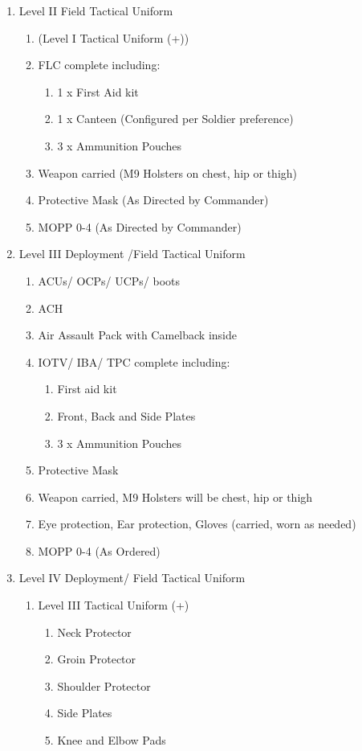 \documentclass{article}
\begin{document}
\begin{enumerate}
\item Level II Field Tactical Uniform
\begin{enumerate}
    \item (Level I Tactical Uniform (+))
     \item	FLC complete including:
     \begin{enumerate}
         \item  1 x First Aid kit
\item 1 x Canteen (Configured per Soldier preference)
\item 3 x Ammunition Pouches
\end{enumerate}
\item	Weapon carried (M9 Holsters on chest, hip or thigh)
\item	Protective Mask (As Directed by Commander)
\item	MOPP 0-4 (As Directed by Commander) 
\end{enumerate}
\item Level III Deployment /Field Tactical Uniform
\begin{enumerate}
    \item 	ACUs/ OCPs/ UCPs/ boots
    \item	ACH
	\item Air Assault Pack with Camelback inside
    \item IOTV/ IBA/ TPC complete including:
    \begin{enumerate}
        \item First aid kit
        \item Front, Back and Side Plates
		\item 3 x Ammunition Pouches
		\end{enumerate}
	\item	Protective Mask
	\item	Weapon carried, M9 Holsters will be chest, hip or thigh
	\item	Eye protection, Ear protection, Gloves (carried, worn as needed)	\item	MOPP 0-4 (As Ordered) 
\end{enumerate}
\item Level IV Deployment/ Field Tactical Uniform
\begin{enumerate}
    \item Level III Tactical Uniform (+)
    \begin{enumerate}
        \item Neck Protector
		\item Groin Protector
		\item Shoulder Protector
		\item Side Plates
		\item Knee and Elbow Pads
		\end{enumerate}
		\end{enumerate}
\end{enumerate}
\end{document}
